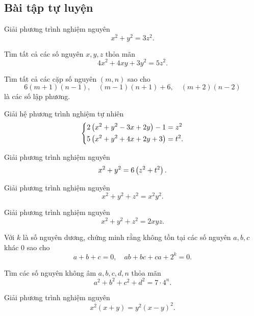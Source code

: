\subsection*{Bài tập tự luyện}

\begin{btt} Giải phương trình nghiệm nguyên $$x^2+y^2=3z^2.$$
\end{btt}

\begin{btt}
Tìm tất cả các số nguyên $x,y,z$ thỏa mãn $$4x^2+4xy+3y^2=5z^2.$$
\end{btt}


\begin{btt}
Tìm tất cả các cặp số nguyên $(m,n)$ sao cho $$6(m+1)(n-1), \quad (m-1)(n+1)+6,\quad (m+2)(n-2)$$
là các số lập phương.
\end{btt}

\begin{btt}
Giải hệ phương trình nghiệm tự nhiên
$$\left\{\begin{aligned}&2\left({x}^{2}+{y}^{2}-3 {x}+2 {y}\right)-1=z^2 \\ &5\left({x}^{2}+{y}^{2}+4 {x}+2 {y}+3\right)=t^2.\end{aligned}\right.$$
\end{btt}

\begin{btt}
Giải phương trình nghiệm nguyên $$x^2 + y^2 = 6\left(\displaystyle z^2 + t^2 \right).$$
\end{btt}

\begin{btt}
Giải phương trình nghiệm nguyên
$$x^2+y^2+z^2=x^2y^2.$$
\end{btt}

\begin{btt} 
Giải phương trình nghiệm nguyên
$$x^2+y^2+z^2=2xyz.$$
\end{btt}

\begin{btt}
  Với $k$ là số nguyên dương, chứng minh rằng không tồn tại các số nguyên $a, b, c$ khác 0 sao cho \[a+b+c=0,\quad ab+bc+ca+{{2}^{k}}=0.\]
\end{btt}

\begin{btt}
Tìm các số nguyên không âm $a, b, c, d, n$ thỏa mãn
\[a^{2}+b^{2}+c^{2}+d^{2}=7 \cdot 4^{n}.\]
\end{btt}

\begin{btt}
Giải phương trình nghiệm nguyên
\[x^2(x+y)=y^2(x-y)^2.\]
\end{btt}

